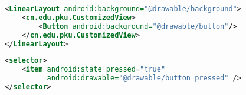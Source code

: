 \begin{lstlisting}[frame=single,
   basicstyle=\small\ttfamily,
   breaklines=true,
   language=xml,
   commentstyle=\color{pgreen},
  keywordstyle=\color{pblue},
  stringstyle=\color{pgreen},
  caption = Layout file,
 label = layout_xml,
 captionpos=b
]
<LinearLayout android:background="@drawable/background">
    <cn.edu.pku.CustomizedView>
        <Button android:background="@drawable/button"/>
    </cn.edu.pku.CustomizedView>
</LinearLayout>
\end{lstlisting}


\begin{lstlisting}[frame=single,
   basicstyle=\small\ttfamily,
   breaklines=true,
   language=xml,
   commentstyle=\color{pgreen},
  keywordstyle=\color{pblue},
  stringstyle=\color{pgreen},
  caption = Drawable file,
 label = drawable_xml,
 captionpos=b
]
<selector>
    <item android:state_pressed="true"
          android:drawable="@drawable/button_pressed" />
</selector>
\end{lstlisting}